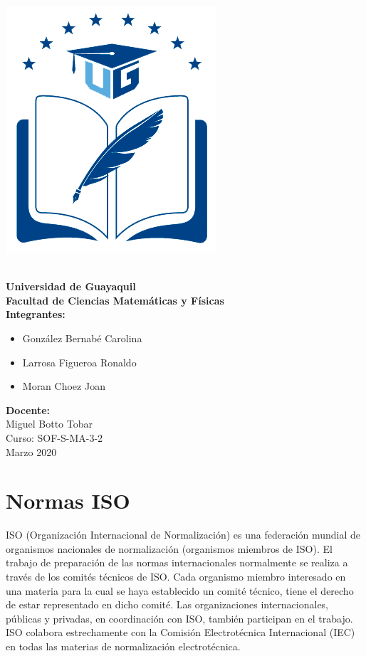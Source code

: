 \documentclass[12pt,a4paper]{article}
\begin{document}
	
\begin{center}
\begin{ug}
\centering
\includegraphics[scale=0.2]{UG.png}
\end{ug}\\
\textbf{Universidad de Guayaquil}\\

\textbf{Facultad de Ciencias Matemáticas y Físicas}\\

\textbf{Integrantes: }\\
\begin{itemize}
\item González Bernabé Carolina\\      
\item Larrosa Figueroa Ronaldo\\
\item Moran Choez Joan\\
\end{itemize}



\textbf{Docente: }\\
 Miguel Botto Tobar\\
Curso: SOF-S-MA-3-2\\
Marzo 2020
\end{center} 

\newpage
\tableofcontents
\newpage

\section{Normas ISO}

ISO (Organización Internacional de Normalización) es una federación mundial de organismos nacionales de normalización (organismos miembros de ISO). El trabajo de preparación de las normas internacionales normalmente se realiza a través de los comités técnicos de ISO. Cada organismo miembro interesado en una materia para la cual se haya establecido un comité técnico, tiene el derecho de estar representado en dicho comité. Las organizaciones internacionales, públicas y privadas, en coordinación con ISO, también participan en el trabajo. ISO colabora estrechamente con la Comisión Electrotécnica Internacional (IEC) en todas las materias de normalización electrotécnica.\\
\end{document}
